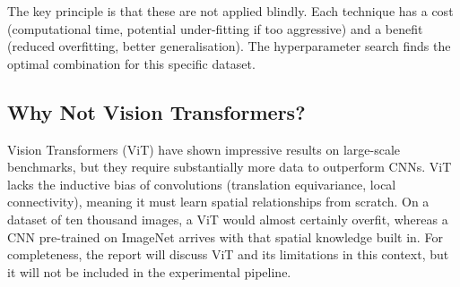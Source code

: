 The key principle is that these are not applied blindly. Each technique has a cost (computational time, potential under-fitting if too aggressive) and a benefit (reduced overfitting, better generalisation). The hyperparameter search finds the optimal combination for this specific dataset.

\subsection{Why Not Vision Transformers?}

Vision Transformers (ViT) \citep{dosovitskiy2020image} have shown impressive results on large-scale benchmarks, but they require substantially more data to outperform CNNs. ViT lacks the inductive bias of convolutions (translation equivariance, local connectivity), meaning it must learn spatial relationships from scratch. On a dataset of ten thousand images, a ViT would almost certainly overfit, whereas a CNN pre-trained on ImageNet arrives with that spatial knowledge built in. For completeness, the report will discuss ViT and its limitations in this context, but it will not be included in the experimental pipeline.
